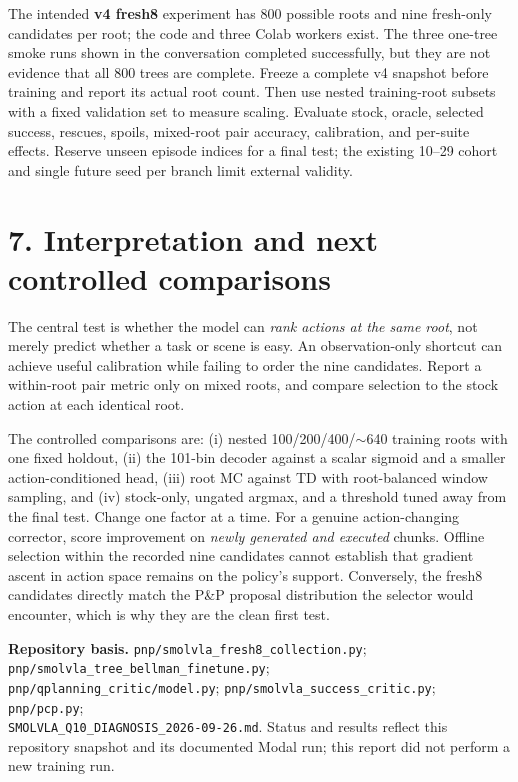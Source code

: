 \documentclass[10pt,letterpaper]{article}
\begin{document}
The intended \textbf{v4 fresh8} experiment has 800 possible roots and nine fresh-only candidates per root; the code and three Colab workers exist. The three one-tree smoke runs shown in the conversation completed successfully, but they are not evidence that all 800 trees are complete. Freeze a complete v4 snapshot before training and report its actual root count. Then use nested training-root subsets with a fixed validation set to measure scaling. Evaluate stock, oracle, selected success, rescues, spoils, mixed-root pair accuracy, calibration, and per-suite effects. Reserve unseen episode indices for a final test; the existing 10--29 cohort and single future seed per branch limit external validity.

\section*{7. Interpretation and next controlled comparisons}
The central test is whether the model can \emph{rank actions at the same root}, not merely predict whether a task or scene is easy. An observation-only shortcut can achieve useful calibration while failing to order the nine candidates. Report a within-root pair metric only on mixed roots, and compare selection to the stock action at each identical root.

The controlled comparisons are: (i) nested 100/200/400/$\sim$640 training roots with one fixed holdout, (ii) the 101-bin decoder against a scalar sigmoid and a smaller action-conditioned head, (iii) root MC against TD with root-balanced window sampling, and (iv) stock-only, ungated argmax, and a threshold tuned away from the final test. Change one factor at a time.
For a genuine action-changing corrector, score improvement on \emph{newly generated and executed} chunks. Offline selection within the recorded nine candidates cannot establish that gradient ascent in action space remains on the policy's support. Conversely, the fresh8 candidates directly match the P\&P proposal distribution the selector would encounter, which is why they are the clean first test.

{\small\textbf{Repository basis.} \texttt{pnp/smolvla\_fresh8\_collection.py}; \texttt{pnp/smolvla\_tree\_bellman\_finetune.py};\\
\texttt{pnp/qplanning\_critic/model.py}; \texttt{pnp/smolvla\_success\_critic.py}; \texttt{pnp/pcp.py};\\
\texttt{SMOLVLA\_Q10\_DIAGNOSIS\_2026-09-26.md}. Status and results reflect this repository snapshot and its documented Modal run; this report did not perform a new training run.}
\end{document}
